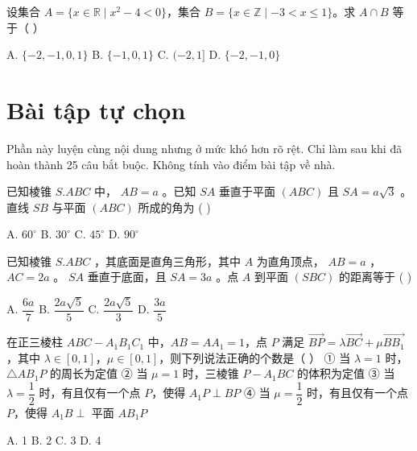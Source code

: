 \documentclass[11pt, a4paper]{article}
\begin{document}
\begin{baitap}[25]
设集合 $A=\{x\in\mathbb{R}\mid x^2-4<0\}$，集合 $B=\{x\in\mathbb{Z}\mid -3<x\le1\}$。求 $A\cap B$ 等于（ ）
\par\vspace{3pt}
\noindent A. $\{-2,-1,0,1\}$ \quad B. $\{-1,0,1\}$ \quad C. $(-2,1]$ \quad D. $\{-2,-1,0\}$
\end{baitap}

\clearpage
\section{Bài tập tự chọn}

Phần này luyện cùng nội dung nhưng ở mức khó hơn rõ rệt. Chỉ làm sau khi đã hoàn thành 25 câu bắt buộc. Không tính vào điểm bài tập về nhà.

\begin{baitap}[1]
已知棱锥 $S.ABC$ 中， $AB = a$ 。已知 $SA$ 垂直于平面 $(ABC)$ 且 $SA = a\sqrt{3}$ 。直线 $SB$ 与平面 $(ABC)$ 所成的角为 ( )
\par\vspace{3pt}
\noindent A. $60^\circ$ \quad B. $30^\circ$ \quad C. $45^\circ$ \quad D. $90^\circ$
\end{baitap}

\begin{baitap}[2]
已知棱锥 $S.ABC$ ，其底面是直角三角形，其中 $A$ 为直角顶点， $AB = a$ ， $AC = 2a$ 。 $SA$ 垂直于底面，且 $SA = 3a$ 。点 $A$ 到平面 $(SBC)$ 的距离等于 ( )
\par\vspace{3pt}
\noindent A. $\dfrac{6a}{7}$ \quad B. $\dfrac{2a\sqrt{5}}{5}$ \quad C. $\dfrac{2a\sqrt{5}}{3}$ \quad D. $\dfrac{3a}{5}$
\end{baitap}

\begin{baitap}[3]
在正三棱柱 $ABC - A_1B_1C_1$ 中，$AB = AA_1 = 1$，点 $P$ 满足 $\overrightarrow{BP} = \lambda \overrightarrow{BC} + \mu \overrightarrow{BB_1}$，其中 $\lambda \in [0, 1]$，$\mu \in [0, 1]$，则下列说法正确的个数是（ ） ① 当 $\lambda = 1$ 时，$\triangle AB_1P$ 的周长为定值 ② 当 $\mu = 1$ 时，三棱锥 $P - A_1BC$ 的体积为定值 ③ 当 $\lambda = \dfrac{1}{2}$ 时，有且仅有一个点 $P$，使得 $A_1P \perp BP$ ④ 当 $\mu = \dfrac{1}{2}$ 时，有且仅有一个点 $P$，使得 $A_1B \perp$ 平面 $AB_1P$
\par\vspace{3pt}
\noindent A. 1 \quad B. 2 \quad C. 3 \quad D. 4
\end{baitap}
\end{document}
